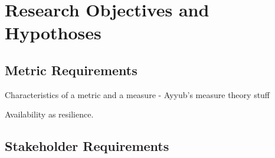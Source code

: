 
\renewcommand{\thechapter}{3}

\chapter{Research Objectives and Hypothoses}

\section{Metric Requirements}
Characteristics of a metric and a measure - Ayyub's measure theory
stuff

Availability as resilience.


\cite{Ayyub2014a}

\section{Stakeholder Requirements}

